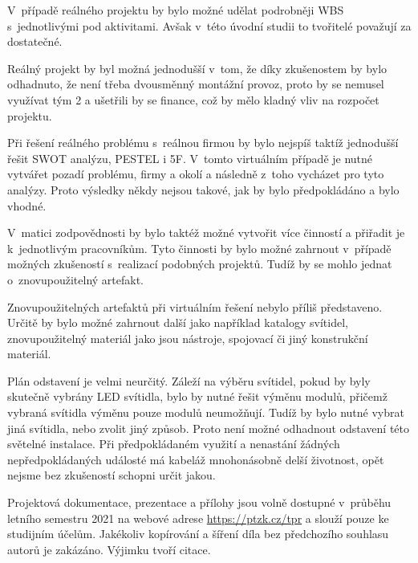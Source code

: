 \documentclass[a4paper, twoside, 11pt]{article}
\begin{document}
	V~případě reálného projektu by bylo možné udělat podrobněji WBS s~jednotlivými pod aktivitami. Avšak v~této úvodní studii to tvořitelé považují za dostatečné.\par
	Reálný projekt by byl možná jednodušší v~tom, že díky zkušenostem by bylo odhadnuto, že není třeba dvousměnný montážní provoz, proto by se nemusel využívat tým 2 a ušetřili by se finance, což by mělo kladný vliv na rozpočet projektu.\par
	Při řešení reálného problému s~reálnou firmou by bylo nejspíš taktíž jednodušší řešit SWOT analýzu, PESTEL i 5F. V~tomto virtuálním případě je nutné vytvářet pozadí problému, firmy a okolí a následně z~toho vycházet pro tyto analýzy. Proto výsledky někdy nejsou takové, jak by bylo předpokládáno a bylo vhodné.\par
	V~matici zodpovědnosti by bylo taktéž možné vytvořit více činností a přiřadit je k~jednotlivým pracovníkům. Tyto činnosti by bylo možné zahrnout v~případě možných zkušeností s~realizací podobných projektů. Tudíž by se mohlo jednat o~znovupoužitelný artefakt.\par
	Znovupoužitelných artefaktů při virtuálním řešení nebylo příliš představeno. Určitě by bylo možné zahrnout další jako například katalogy svítidel, znovupoužitelný materiál jako jsou nástroje, spojovací či jiný konstrukční materiál.\par
	Plán odstavení je velmi neurčitý. Záleží na výběru svítidel, pokud by byly skutečně vybrány LED svítidla, bylo by nutné řešit výměnu modulů, přičemž vybraná svítidla výměnu pouze modulů neumožňují. Tudíž by bylo nutné vybrat jiná svítidla, nebo zvolit jiný způsob. Proto není možné odhadnout odstavení této světelné instalace. Při předpokládaném využití a nenastání žádných nepředpokládaných událosté má kabeláž mnohonásobně delší životnost, opět nejsme bez zkušeností schopni určit jakou.
		
	\vspace*{11pt}
		Projektová dokumentace, prezentace a přílohy jsou volně dostupné v~průběhu  letního semestru 2021 na webové adrese \url{https://ptzk.cz/tpr} a slouží pouze ke studijním účelům. Jakékoliv kopírování a šíření díla bez předchozího souhlasu autorů je zakázáno. Výjimku tvoří citace.

\newpage
\printbibliography[title={{Zdroje}}]	
\nocite{*}

\end{document}
